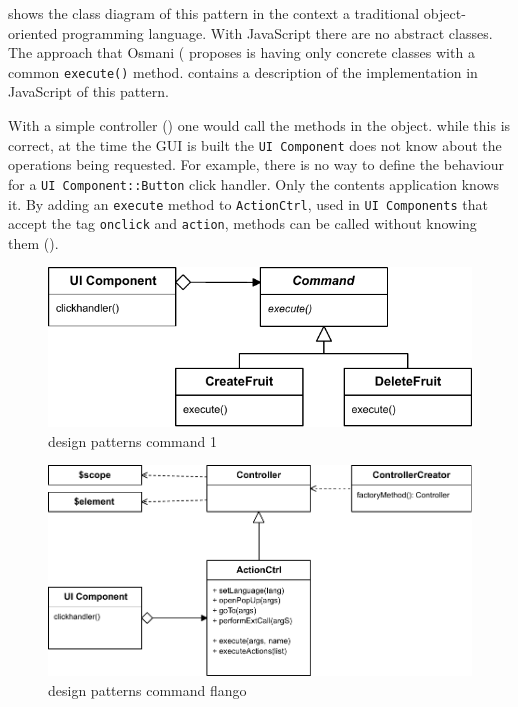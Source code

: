  shows the class diagram of this pattern in the context a traditional object-oriented programming language.
With JavaScript there are no abstract classes.
The approach that Osmani (\cite{Osmani:2012} proposes is having only concrete classes with a common \texttt{execute()} method.
 contains a description of the implementation in JavaScript of this pattern.


With a simple controller () one would call the methods in the object.
while this is correct, at the time the \ac{GUI} is built the \texttt{UI Component} does not know about the operations being requested.
For example, there is no way to define the behaviour for a \texttt{UI Component::Button} click handler.
Only the contents application knows it.
By adding an \texttt{execute} method to \texttt{ActionCtrl}, used in \texttt{UI Components} that accept the tag \texttt{onclick} and \texttt{action}, methods can be called without knowing them ().

\begin{figure}[htb]
    \centering
    \includegraphics{figures/design-patterns-command-1.pdf}
    \caption{design patterns command 1}
    \label{fig:design-command-general}
\end{figure}

\begin{figure}[htb]
    \centering
    \includegraphics{figures/design-patterns-command-flango.pdf}
    \caption{design patterns command flango}
    \label{fig:design-command-flango}
\end{figure}

